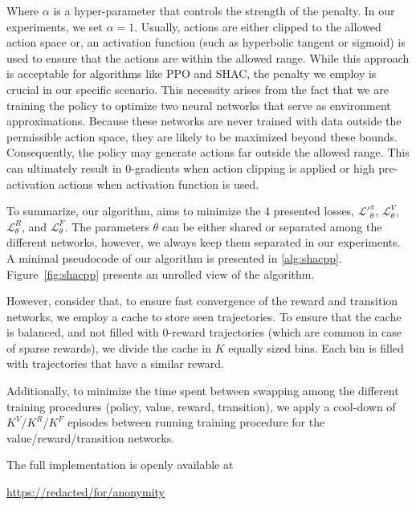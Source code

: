     Where $\alpha$ is a hyper-parameter that controls the strength of the penalty. In our experiments, we set $\alpha=1$. Usually, actions are either clipped to the allowed action space or, an activation function (such as hyperbolic tangent or sigmoid) is used to ensure that the actions are within the allowed range. While this approach is acceptable for algorithms like PPO and SHAC, the penalty we employ is crucial in our specific scenario. This necessity arises from the fact that we are training the policy to optimize two neural networks that serve as environment approximations. Because these networks are never trained with data outside the permissible action space, they are likely to be maximized beyond these bounds. Consequently, the policy may generate actions far outside the allowed range. This can ultimately result in 0-gradients when action clipping is applied or high pre-activation actions when activation function is used. 

To summarize, our algorithm, aims to minimize the 4 presented losses, $\mathcal{L'}_\theta^{\pi}$, $\mathcal{L}_\theta^V$, $\mathcal{L}_\theta^R$, and $\mathcal{L}_\theta^F$. The parameters $\theta$ can be either shared or separated among the different networks, however, we always keep them separated in our experiments. A minimal pseudocode of our algorithm is presented in \ref{alg:shacpp}. Figure~\ref{fig:shacpp} presents an unrolled view of the \fname{} algorithm.

However, consider that, to ensure fast convergence of the reward and transition networks, we employ a cache to store seen trajectories. To ensure that the cache is balanced, and not filled with $0$-reward trajectories (which are common in case of sparse rewards), we divide the cache in $K$ equally sized bins. Each bin is filled with trajectories that have a similar reward. 

Additionally, to minimize the time spent between swapping among the different training procedures (policy, value, reward, transition), we apply a cool-down of $K^V$/$K^R$/$K^F$ episodes between running training procedure for the value/reward/transition networks. 

The full implementation is openly available at 
\begin{center}
\url{https://redacted/for/anonymity}
\end{center}


